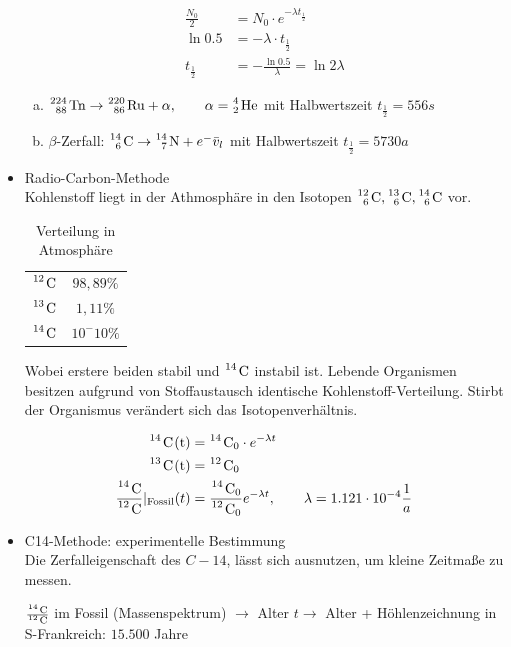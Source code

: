 \begin{Beispiel}
\begin{itemize}
\begin{align*}
  \frac{N_0}{2} &= N_0 \cdot e^{-\lambda t_{\frac 1 2}}\\
  \ln 0.5 &=-\lambda \cdot t_{\frac 1 2} \\
  t_{\frac 1 2} &= - \frac{\ln 0.5}\lambda = {\ln 2}{\lambda} 
\end{align*}

 \begin{ex*}
  \begin{enumerate}[a)]
   \item $\ce{^{224}_{88} Tn} \rightarrow \ce{^{220}_{86} Ru} + \alpha, \qquad \alpha=\ce{^4_2 He}$ mit Halbwertszeit $t_{\frac 1 2}=556s$
   \item $\beta$-Zerfall: $\ce{^{14}_6 C} \to \ce{^{14}_7 N} + e^- \bar v_l$ mit Halbwertszeit $t_{\frac 1 2}=5730 a$  
 \end{enumerate}
 \end{ex*}
\item Radio-Carbon-Methode \\
 Kohlenstoff liegt in der Athmosphäre in den Isotopen $\ce{^{12}_6 C}, \ce{^{13}_6 C}, \ce{^{14}_6 C}$ vor.

\begin{table}
\centering
 \caption{Verteilung in Atmosphäre}
 \begin{tabular}{c|c}
  $\ce{^{12} C}$&  $98,89\%$ \\
  $\ce{^{13} C}$& $1,11\%$ \\
 $\ce{^{14} C}$& $10^-10 \%$ \\
 \end{tabular}
\end{table}
 Wobei erstere beiden stabil und $\ce{^{14} C}$ instabil ist.  Lebende Organismen besitzen aufgrund von Stoffaustausch identische Kohlenstoff-Verteilung.  Stirbt der Organismus verändert sich das Isotopenverhältnis.

 
 \begin{align*}
  \ce{^{14} C(t)}&=\ce{^{14} C_0} \cdot e^{-\lambda t} \\
 \ce{^{13} C(t)}&=\ce{^{12} C_0}\\
 \frac{\ce{^{14} C}}{\ce{^{12} C}} |_\text{Fossil} (t)&= \frac{\ce{^{14} C_0}}{\ce{^{12} C_0}} e^{-\lambda t}, \qquad \lambda=1.121\cdot 10^{-4} \frac{1}{a}
 \end{align*}
\item C14-Methode: experimentelle Bestimmung\\
Die Zerfalleigenschaft des $C-14$, lässt sich ausnutzen, um kleine Zeitmaße zu messen.
\begin{ex*}
 $\frac{\ce{^{14}  C}}{\ce{^{12} C}}$ im Fossil (Massenspektrum) $\rightarrow$ Alter $t \rightarrow$ Alter + Höhlenzeichnung in S-Frankreich:  $15.500$ Jahre
\end{ex*}
\end{itemize}
\end{Beispiel}





